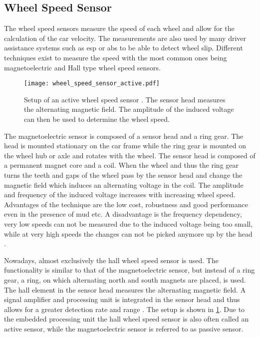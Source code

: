 \subsection{Wheel Speed Sensor}
The wheel speed sensors measure the speed of each wheel and allow for the calculation of the car velocity.
The measurements are also used by many driver assistance systems such as \gls{esp} or \gls{abs} to be able to detect wheel slip.
Different techniques exist to measure the speed with the most common ones being magnetoelectric and Hall type wheel speed sensors.\par
\begin{figure}[htb]
	\centering
	\texttt{[image: wheel\_speed\_sensor\_active.pdf]}
	\caption[Setup of an active wheel speed sensor]{Setup of an active wheel speed sensor \cite{Re2011}. The sensor head measures the alternating magnetic field. The amplitude of the induced voltage can then be used to determine the wheel speed.}
	\label{fig:wheel_speed_sensor_active}
\end{figure}
The magnetoelectric sensor is composed of a sensor head and a ring gear.
The head is mounted stationary on the car frame while the ring gear is mounted on the wheel hub or axle and rotates with the wheel.
The sensor head is composed of a permanent magnet core and a coil.
When the wheel and thus the ring gear turns the teeth and gaps of the wheel pass by the sensor head and change the magnetic field which induces an alternating voltage in the coil.
The amplitude and frequency of the induced voltage increases with increasing wheel speed.
Advantages of the technique are the low cost, robustness and good performance even in the presence of mud etc.
A disadvantage is the frequency dependency, very low speeds can not be measured due to the induced voltage being too small, while at very high speeds the changes can not be picked anymore up by the head \cite{AutoReif2014}.\par
Nowadays, almost exclusively the hall wheel speed sensor is used.
The functionality is similar to that of the magnetoelectric sensor, but instead of a ring gear, a ring, on which alternating north and south magnets are placed, is used.
The hall element in the sensor head measures the alternating magnetic field.
A signal amplifier and processing unit is integrated in the sensor head and thus allows for a greater detection rate and range \cite{Re2011}.
The setup is shown in \cref{fig:wheel_speed_sensor_active}.
Due to the embedded processing unit the hall wheel speed sensor is also often called an active sensor, while the magnetoelectric sensor is referred to as passive sensor.



